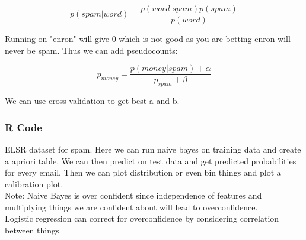 $$p(spam|word) = \frac{p(word|spam)p(spam)}{p(word)}$$

Running on "enron" will give 0 which is not good as you are betting enron will never be spam. Thus we can add pseudocounts:

$$p_{money} = \frac{p(money|spam) + \alpha}{p_{spam}+\beta}$$

We can use cross validation to get best a and b.

\subsubsection{R Code}

ELSR dataset for spam. Here we can run naive bayes on training data and create a apriori table. We can then predict on test data and get predicted probabilities for every email. Then we can plot distribution or even bin things and plot a calibration plot.\\

Note: Naive Bayes is over confident since independence of features and multiplying things we are confident about will lead to overconfidence.\\

Logistic regression can correct for overconfidence by considering correlation between things. 
